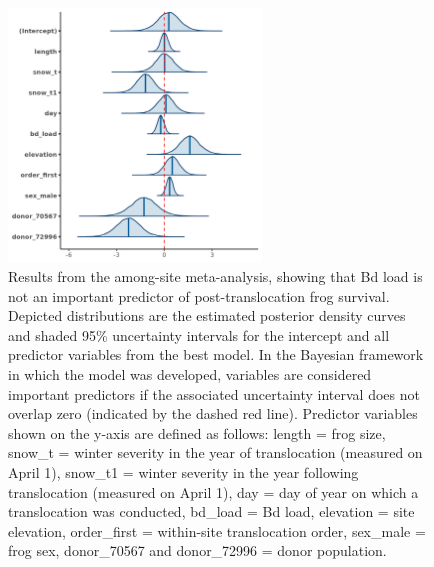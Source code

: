 \documentclass[9pt,twoside,lineno]{pnas-new-SI}
\begin{document}
\begin{figure}

{\centering \includegraphics[width=0.60\textwidth]{figures/mcmc_areas_m1d.png}

}

\caption{\label{fig-survival-postdens}Results from the among-site
meta-analysis, showing that Bd load is not an important predictor of
post-translocation frog survival. Depicted distributions are the
estimated posterior density curves and shaded 95\% uncertainty intervals
for the intercept and all predictor variables from the best model. In
the Bayesian framework in which the model was developed, variables are
considered important predictors if the associated uncertainty interval
does not overlap zero (indicated by the dashed red line). Predictor
variables shown on the y-axis are defined as follows: length = frog
size, snow\_t = winter severity in the year of translocation (measured
on April 1), snow\_t1 = winter severity in the year following
translocation (measured on April 1), day = day of year on which a
translocation was conducted, bd\_load = Bd load, elevation = site
elevation, order\_first = within-site translocation order, sex\_male =
frog sex, donor\_70567 and donor\_72996 = donor population.}

\end{figure}\clearpage

\newpage
\end{document}
